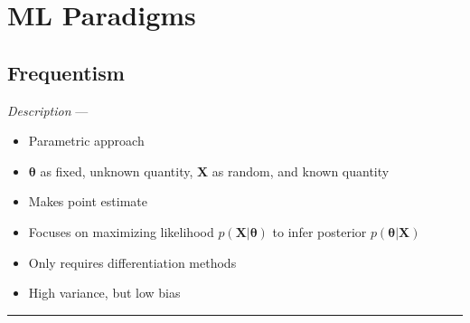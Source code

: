 \section{ML Paradigms}
\subsection*{Frequentism}
\emph{Description} --- 
\begin{itemize}
    \item Parametric approach
    \item $\boldsymbol{\theta}$ as fixed, unknown quantity, $\boldsymbol{X}$ as random, and known quantity
    \item Makes point estimate
    \item Focuses on maximizing likelihood $p(\boldsymbol{X}|\boldsymbol{\theta})$ to infer posterior $p(\boldsymbol{\theta}|\boldsymbol{X})$
    \item Only requires differentiation methods
    \item High variance, but low bias
\end{itemize}

{\color{lightgray}\hrule height 0.001mm}

